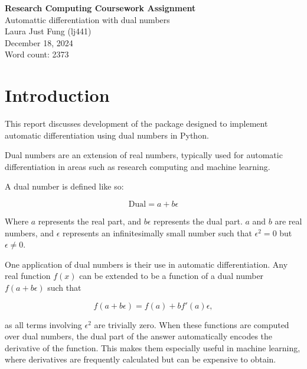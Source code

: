 \documentclass[11pt,a4paper]{article}
\begin{document}
 

\begin{center}
    \LARGE{\textbf{Research Computing Coursework Assignment}}
    \\
    \Large{{Automattic differentiation with dual numbers}}
    \\
    \large{Laura Just Fung (lj441)}
    \\
    December 18, 2024
    \\
    Word count: 2373
\end{center}


\section{Introduction}
This report discusses development of the package designed to implement automatic differentiation using dual numbers in Python. 

Dual numbers are an extension of real numbers, typically used for automatic differentiation in areas such as research computing and machine learning.

A dual number is defined like so:

\begin{equation}
    \mathrm{Dual} = a + b \epsilon
\end{equation}

Where $a$ represents the real part, and $b\epsilon$ represents the dual part. $a$ and $b$ are real numbers, and $\epsilon$ represents an infinitesimally small number such that $\epsilon^2 = 0$ but $\epsilon \neq 0$.

One application of dual numbers is their use in automatic differentiation. Any real function $f(x)$ can be extended to be a function of a dual number $f(a+b \epsilon)$ such that

\begin{equation}
    f(a + b \epsilon) = f(a) + b f'(a)\epsilon,
\end{equation}

as all terms involving $\epsilon^2$ are trivially zero. When these functions are computed over dual numbers, the dual part of the answer automatically encodes the derivative of the function. This makes them especially useful in machine learning, where derivatives are frequently calculated but can be expensive to obtain.


\end{document}
